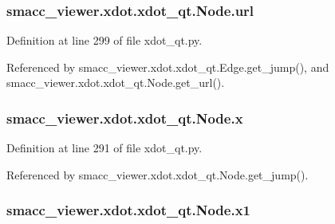 \subsubsection[{\texorpdfstring{url}{url}}]{\setlength{\rightskip}{0pt plus 5cm}smacc\+\_\+viewer.\+xdot.\+xdot\+\_\+qt.\+Node.\+url}\hypertarget{classsmacc__viewer_1_1xdot_1_1xdot__qt_1_1Node_aaa2ca7fd71f0858125aaca32c925858f}{}\label{classsmacc__viewer_1_1xdot_1_1xdot__qt_1_1Node_aaa2ca7fd71f0858125aaca32c925858f}


Definition at line 299 of file xdot\+\_\+qt.\+py.



Referenced by smacc\+\_\+viewer.\+xdot.\+xdot\+\_\+qt.\+Edge.\+get\+\_\+jump(), and smacc\+\_\+viewer.\+xdot.\+xdot\+\_\+qt.\+Node.\+get\+\_\+url().

\subsubsection[{\texorpdfstring{x}{x}}]{\setlength{\rightskip}{0pt plus 5cm}smacc\+\_\+viewer.\+xdot.\+xdot\+\_\+qt.\+Node.\+x}\hypertarget{classsmacc__viewer_1_1xdot_1_1xdot__qt_1_1Node_a85d5d46a7ec138627e137f9cefd5a0ad}{}\label{classsmacc__viewer_1_1xdot_1_1xdot__qt_1_1Node_a85d5d46a7ec138627e137f9cefd5a0ad}


Definition at line 291 of file xdot\+\_\+qt.\+py.



Referenced by smacc\+\_\+viewer.\+xdot.\+xdot\+\_\+qt.\+Node.\+get\+\_\+jump().

\subsubsection[{\texorpdfstring{x1}{x1}}]{\setlength{\rightskip}{0pt plus 5cm}smacc\+\_\+viewer.\+xdot.\+xdot\+\_\+qt.\+Node.\+x1}\hypertarget{classsmacc__viewer_1_1xdot_1_1xdot__qt_1_1Node_ae31872230f5ef222322a4cc04e7d5df8}{}\label{classsmacc__viewer_1_1xdot_1_1xdot__qt_1_1Node_ae31872230f5ef222322a4cc04e7d5df8}


